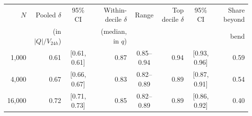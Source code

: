 \begin{tabular}{rrcrcrcr}
\toprule
\(N\) & Pooled \(\delta\) & 95\% CI & Within-decile \(\delta\) & Range & Top decile \(\delta\) & 95\% CI & Share beyond \\
 & (in \(|Q|/V_{24h}\)) &  & (median, in \(q\)) &  &  &  & bend \\
\midrule
1,000 & 0.61 & [0.61, 0.61] & 0.87 & 0.85--0.94 & 0.94 & [0.93, 0.96] & 0.59 \\
4,000 & 0.67 & [0.66, 0.67] & 0.83 & 0.82--0.89 & 0.89 & [0.87, 0.91] & 0.54 \\
16,000 & 0.72 & [0.71, 0.73] & 0.85 & 0.82--0.89 & 0.89 & [0.86, 0.92] & 0.40 \\
\bottomrule
\end{tabular}
